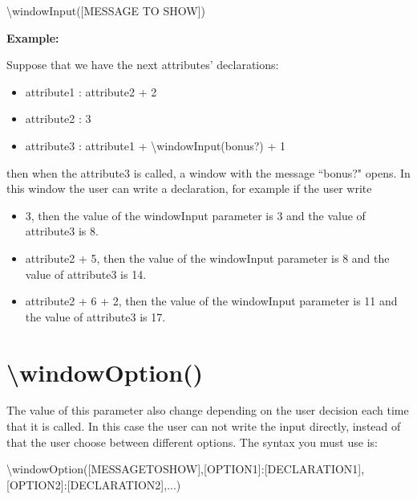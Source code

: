 \documentclass[11pt,a4paper,openright,oneside]{book}
\newenvironment{ex}
{
  \setlength{\parindent}{0cm}
  \large \textbf{Example:} \normalsize 
}
{}
\begin{document}
\begin{center} \textsf{\textbackslash windowInput(\textsc{\scriptsize[MESSAGE TO SHOW]})} \end{center}

\begin{ex}
  Suppose that we have the next attributes' declarations:
  \begin{itemize}
    \item \textsf{attribute1 : attribute2 + 2}
    \item \textsf{attribute2 : 3}
    \item \textsf{attribute3 : attribute1 + \textbackslash windowInput(bonus?) + 1}
  \end{itemize}  
  then when the \textsf{attribute3} is called, a window with the message ``bonus?" opens. In this window the user can write a declaration, for example if the user write
  \begin{itemize}
    \item \textsf{3}, then the value of the \textsf{windowInput} parameter is 3 and the value of \textsf{attribute3} is \textsf{8}.
    \item \textsf{attribute2 + 5}, then the value of the \textsf{windowInput} parameter is \textsf{8} and the value of \textsf{attribute3} is \textsf{14}.
    \item \textsf{attribute2 + 6 + 2}, then the value of the \textsf{windowInput} parameter is \textsf{11} and the value of \textsf{attribute3} is \textsf{17}.
  \end{itemize}

\end{ex}

\section{\textsf{\textbackslash windowOption()}}

The value of this parameter also change depending on the user decision each time that it is called. In this case the user can not write the input directly, instead of that the user choose between different options. The syntax you must use is:

\begin{center} \small \textsf{\textbackslash windowOption(\textsc{\scriptsize[MESSAGETOSHOW]},\textsc{\scriptsize[OPTION1]}:\textsc{\scriptsize[DECLARATION1]},\textsc{\scriptsize[OPTION2]}:\textsc{\scriptsize[DECLARATION2]},...)} \normalsize \end{center}
\end{document}
